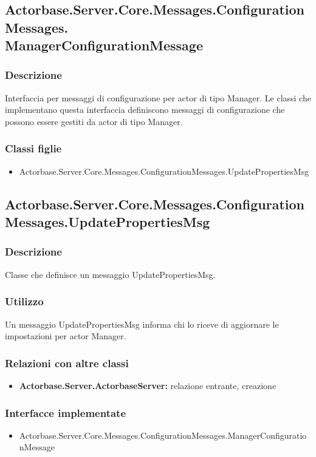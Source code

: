 \documentclass[a4paper]{article}
\begin{document}
			\subsection{Actorbase.Server.Core.Messages.ConfigurationMessages.\\ ManagerConfigurationMessage}
			\subsubsection{Descrizione}
				Interfaccia per messaggi di configurazione per actor di tipo Manager. 
				Le classi che implementano questa interfaccia definiscono messaggi di configurazione che possono essere gestiti da actor di tipo Manager.
			\subsubsection{Classi figlie}
			\begin{itemize}
				\item Actorbase.Server.Core.Messages.ConfigurationMessages.UpdatePropertiesMsg
			\end{itemize}

			\subsection{Actorbase.Server.Core.Messages.ConfigurationMessages.UpdatePropertiesMsg}
			\subsubsection{Descrizione}
				Classe che definisce un messaggio UpdatePropertiesMsg.
			\subsubsection{Utilizzo}
				Un messaggio UpdatePropertiesMsg informa chi lo riceve di aggiornare le impostazioni per actor Manager.
			\subsubsection{Relazioni con altre classi}
			\begin{itemize}
				\item \textbf{Actorbase.Server.ActorbaseServer:} relazione entrante, creazione
			\end{itemize}
			\subsubsection{Interfacce implementate}
			\begin{itemize}
				\item Actorbase.Server.Core.Messages.ConfigurationMessages.ManagerConfigurationMessage
			\end{itemize}
\end{document}
